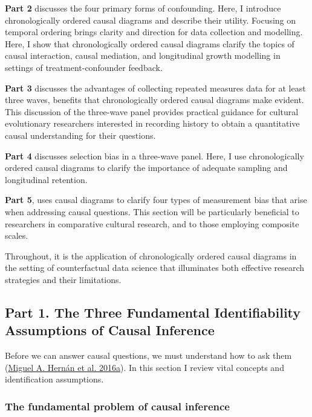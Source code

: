 \documentclass[
  singlecolumn]{article}
\begin{document}
\textbf{Part 2} discusses the four primary forms of confounding. Here, I
introduce chronologically ordered causal diagrams and describe their
utility. Focusing on temporal ordering brings clarity and direction for
data collection and modelling. Here, I show that chronologically ordered
causal diagrams clarify the topics of causal interaction, causal
mediation, and longitudinal growth modelling in settings of
treatment-confounder feedback.

\textbf{Part 3} discusses the advantages of collecting repeated measures
data for at least three waves, benefits that chronologically ordered
causal diagrams make evident. This discussion of the three-wave panel
provides practical guidance for cultural evolutionary researchers
interested in recording history to obtain a quantitative causal
understanding for their questions.

\textbf{Part 4} discusses selection bias in a three-wave panel. Here, I
use chronologically ordered causal diagrams to clarify the importance of
adequate sampling and longitudinal retention.

\textbf{Part 5}, uses causal diagrams to clarify four types of
measurement bias that arise when addressing causal questions. This
section will be particularly beneficial to researchers in comparative
cultural research, and to those employing composite scales.

Throughout, it is the application of chronologically ordered causal
diagrams in the setting of counterfactual data science that illuminates
both effective research strategies and their limitations.

\hypertarget{part-1.-the-three-fundamental-identifiability-assumptions-of-causal-inference}{%
\subsection{Part 1. The Three Fundamental Identifiability Assumptions of
Causal
Inference}\label{part-1.-the-three-fundamental-identifiability-assumptions-of-causal-inference}}

Before we can answer causal questions, we must understand how to ask
them (\protect\hyperlink{ref-hernuxe1n2016}{Miguel A. Hernán et al.
2016a}). In this section I review vital concepts and identification
assumptions.

\hypertarget{the-fundamental-problem-of-causal-inference}{%
\subsubsection{The fundamental problem of causal
inference}\label{the-fundamental-problem-of-causal-inference}}
\end{document}
